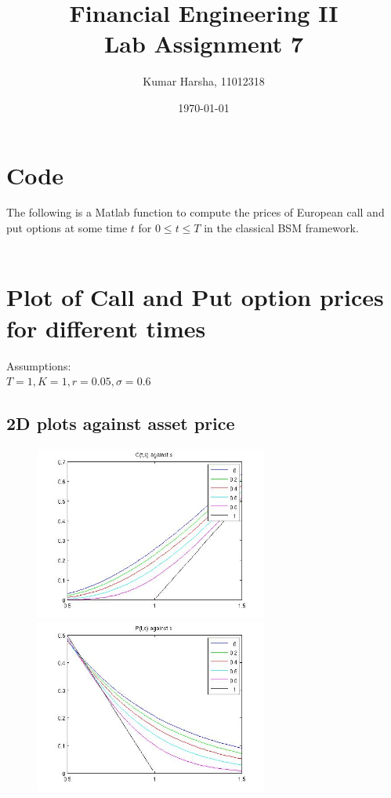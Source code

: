 \documentclass[12pt]{article}
\begin{document}
\title{Financial Engineering II\\Lab Assignment 7}
\author{Kumar Harsha, 11012318}
\date{\today}
\maketitle
\tableofcontents
\newpage

\section{Code}
  The following is a Matlab function to compute the prices of European call and put options at some time $t$ for $0 \leq t \leq T$ in the classical BSM framework.\\ \\
  
  
\newpage
\section{Plot of Call and Put option prices for different times}
  Assumptions:\\
  $T = 1, K = 1, r = 0.05, \sigma = 0.6$\\
  \subsection*{2D plots against asset price}
    \begin{figure}[ht]
    \centering
      \begin{minipage}{.45\textwidth}
        \centering
        \includegraphics[width=3in]{call-s.jpg}
      \end{minipage}
      \begin{minipage}{.45\textwidth}
        \centering
        \includegraphics[width=3in]{put-s.jpg}
      \end{minipage}
    \end{figure}
\end{document}
